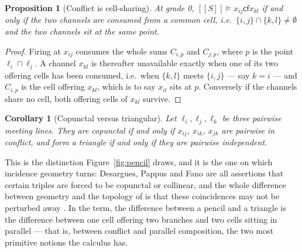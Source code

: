 \documentclass[11pt]{article}
\theoremstyle{plain}
\newtheorem{proposition}[theorem]{Proposition}
\newtheorem{corollary}[theorem]{Corollary}
\theoremstyle{definition}
\newcommand{\enc}[1]{[\![#1]\!]}
\newcommand{\cf}{\mathsf{cf}}
\begin{document}
\begin{proposition}[Conflict is cell-sharing]
\label{prop:conflict}
At grade 0, $\enc{S} \models x_{ij} \cf x_{kl}$ if and only if the two channels are consumed from a
common cell, i.e.\ $\{i,j\} \cap \{k,l\} \neq \emptyset$ and the two channels sit at the same point.
\end{proposition}

\begin{proof}
Firing at $x_{ij}$ consumes the whole sums $C_{i,p}$ and $C_{j,p}$, where $p$ is the point
$\ell_i \cap \ell_j$. A channel $x_{kl}$ is thereafter unavailable exactly when one of its two
offering cells has been consumed, i.e.\ when $\{k,l\}$ meets $\{i,j\}$ --- say $k=i$ --- and
$C_{i,p}$ is the cell offering $x_{kl}$, which is to say $x_{il}$ sits at $p$. Conversely if the
channels share no cell, both offering cells of $x_{kl}$ survive.
\end{proof}

\begin{corollary}[Copunctal versus triangular]
\label{cor:tri}
Let $\ell_i,\ell_j,\ell_k$ be three pairwise meeting lines. They are copunctal if and only if
$x_{ij}$, $x_{ik}$, $x_{jk}$ are pairwise in conflict, and form a triangle if and only if they are
pairwise independent.
\end{corollary}

This is the distinction Figure~\ref{fig:pencil} draws, and it is the one on which incidence
geometry turns: Desargues, Pappus and Fano are all assertions that certain triples are forced to be
copunctal or collinear, and the whole difference between geometry and the topology of
\cite{Knots} is that these coincidences may not be perturbed away \cite[\S1]{Geometry}. In the
term, the difference between a pencil and a triangle is the difference between one cell offering
two branches and two cells sitting in parallel --- that is, between conflict and parallel
composition, the two most primitive notions the calculus has.
\end{document}
